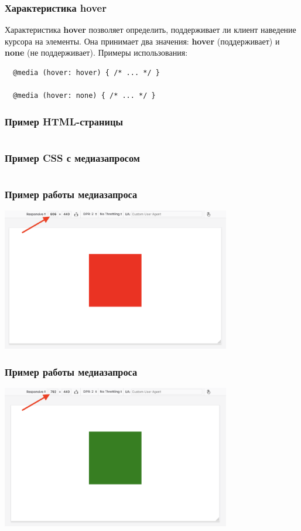 \documentclass[aspectratio=169]{beamer}
\begin{document}
\begin{frame}[fragile]
  \frametitle{Характеристика hover}

  Характеристика \textbf{hover} позволяет определить, поддерживает ли клиент
  наведение курсора на элементы. Она принимает два значения: \textbf{hover}
  (поддерживает) и \textbf{none} (не поддерживает). Примеры использования:

  \begin{verbatim}
  @media (hover: hover) { /* ... */ }

  @media (hover: none) { /* ... */ }
  \end{verbatim}
\end{frame}

\begin{frame}
  \frametitle{Пример HTML-страницы}

  \inputminted{html}{examples/simple/index.html}

\end{frame}

\begin{frame}
  \frametitle{Пример CSS с медиазапросом}

  \inputminted{css}{examples/simple/styles.css}
\end{frame}

\begin{frame}
  \frametitle{Пример работы медиазапроса}

  \centering
  \includegraphics[width=0.75\textwidth]{images/box-example-1.png}
\end{frame}

\begin{frame}
  \frametitle{Пример работы медиазапроса}

  \centering
  \includegraphics[width=0.75\textwidth]{images/box-example-2.png}
\end{frame}
\end{document}
